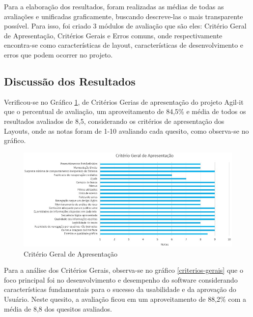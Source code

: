 Para a elaboração dos resultados, foram realizadas as médias de todas as avaliações e unificadas graficamente, buscando descreve-las o mais transparente possível. Para isso, foi criado 3 módulos de avaliação que são eles: Critério Geral de Apresentação, Critérios Gerais e Erros comuns, onde respectivamente encontra-se como características de layout, características de desenvolvimento e erros que podem ocorrer no projeto.

\subsection{Discussão dos Resultados}

Verificou-se no Gráfico \ref{criterio-geral-apresentacao}, de Critérios Gerias de apresentação do projeto Agil-it que o percentual de avaliação, um aproveitamento de 84,5\% e média de todos os resultados avaliados de 8,5, considerando os critérios de apresentação dos Layouts, onde as notas foram de 1-10 avaliando cada quesito, como observa-se no gráfico.

\begin{landscape}
\begin{figure}[H]
	\caption{\label{criterio-geral-apresentacao}Critério Geral de Apresentação}
	\begin{center}
		\includegraphics[scale=0.90]{./Figuras/cap-testes/criterio-geral-apresentacao.jpeg}
	\end{center}
\end{figure}
\end{landscape}

Para a análise dos Critérios Gerais, observa-se no gráfico \ref{criterios-gerais} que o foco principal foi no desenvolvimento e desempenho do software considerando características fundamentais para o sucesso da usabilidade e da aprovação do Usuário. Neste quesito, a avaliação ficou em um aproveitamento de 88,2\% com a média de 8,8 dos quesitos avaliados.

